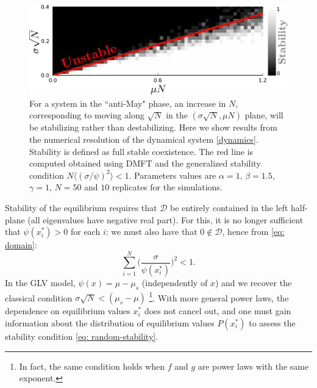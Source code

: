 \begin{figure}[t!]
    \includegraphics[width=.45\textwidth]{figs/beta1_5-S50-N10-diversity.pdf}
    \caption{For a system in the ``anti-May" phase, an increase in $N$,
    corresponding to moving along $\sqrt{N}$ in the $(\sigma \sqrt{N},\mu N)$ plane, will be stabilizing rather than destabilizing.
    Here we show results from the numerical resolution of the dynamical system \eqref{dynamics}. Stability is defined as full stable coexistence. The red line is computed obtained using DMFT and the generalized stability condition $N\langle (\sigma/\psi)^2\rangle < 1$.
    Parameters values are $\alpha=1$, $\beta=1.5$,
    $\gamma=1$, $N=50$ and $10$ replicates for the simulations.}
    \label{fig: stability line + sims}
\end{figure}

Stability of the equilibrium requires that $\mathcal{D}$ be entirely contained in the left half-plane (all eigenvalues have negative real part). For this, it is no longer sufficient that $\psi(x_i^*) > 0$ for each $i$: we must also have that $0\notin \mathcal{D}$, hence from \eqref{eq: domain}:
\begin{equation}
    \sum_{i=1}^N \Big(\frac{\sigma}{\psi(x_i^*)}\Big)^{2}
    < 1.
    \label{eq: random-stability}
\end{equation}
In the GLV model, $\psi(x) = \mu-\mu_s$ (independently of $x$) and we recover the classical condition $\sigma\sqrt{N} < (\mu_s-\mu)$ \footnote{In fact, the same condition holds when $f$ and $g$ are power laws with the same exponent.}. With more general power laws, the dependence on equilibrium values $x_i^*$ does not cancel out, and one must gain information about the distribution of equilibrium values $P(x_i^*)$ to assess the stability condition \eqref{eq: random-stability}.